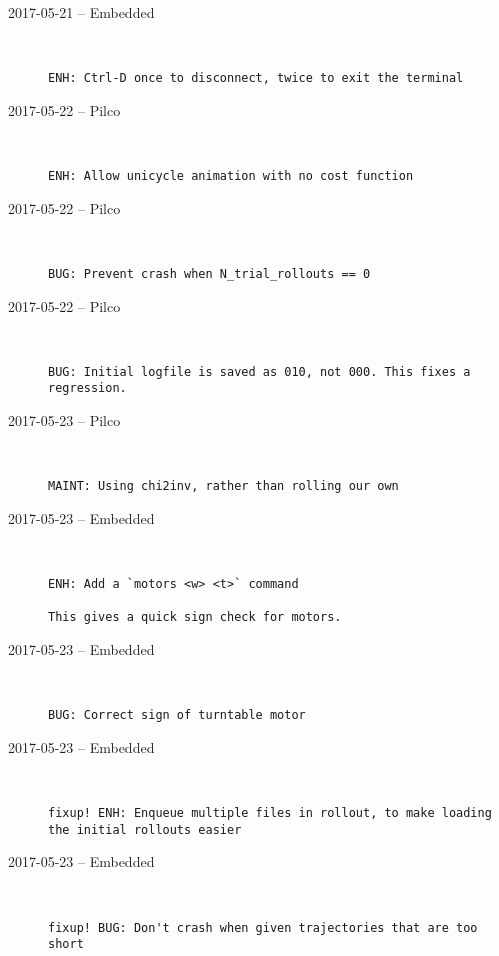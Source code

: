\begin{description}
  \item[2017-05-21 -- Embedded] \hfill \
\begin{lstlisting}
ENH: Ctrl-D once to disconnect, twice to exit the terminal
\end{lstlisting}


  \item[2017-05-22 -- Pilco] \hfill \
\begin{lstlisting}
ENH: Allow unicycle animation with no cost function
\end{lstlisting}


  \item[2017-05-22 -- Pilco] \hfill \
\begin{lstlisting}
BUG: Prevent crash when N_trial_rollouts == 0
\end{lstlisting}


  \item[2017-05-22 -- Pilco] \hfill \
\begin{lstlisting}
BUG: Initial logfile is saved as 010, not 000. This fixes a regression.
\end{lstlisting}


  \item[2017-05-23 -- Pilco] \hfill \
\begin{lstlisting}
MAINT: Using chi2inv, rather than rolling our own
\end{lstlisting}


  \item[2017-05-23 -- Embedded] \hfill \
\begin{lstlisting}
ENH: Add a `motors <w> <t>` command

This gives a quick sign check for motors.
\end{lstlisting}


  \item[2017-05-23 -- Embedded] \hfill \
\begin{lstlisting}
BUG: Correct sign of turntable motor
\end{lstlisting}


  \item[2017-05-23 -- Embedded] \hfill \
\begin{lstlisting}
fixup! ENH: Enqueue multiple files in rollout, to make loading the initial rollouts easier
\end{lstlisting}


  \item[2017-05-23 -- Embedded] \hfill \
\begin{lstlisting}
fixup! BUG: Don't crash when given trajectories that are too short
\end{lstlisting}



\end{description}
